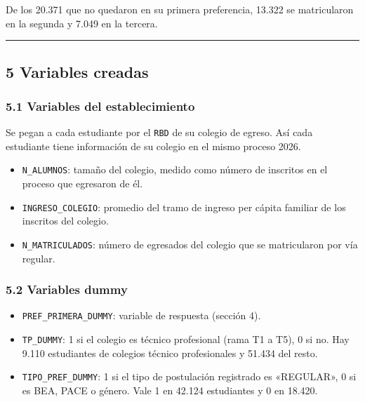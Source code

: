 \documentclass[11pt]{article}
\begin{document}
De los 20.371 que no quedaron en su primera preferencia, 13.322 se
matricularon en la segunda y 7.049 en la tercera.

\medskip\hrule\medskip

\subsection*{5 \; Variables creadas}

\subsubsection*{5.1 \; Variables del establecimiento}

Se pegan a cada estudiante por el \texttt{RBD} de su colegio de egreso.
Así cada estudiante tiene información de su colegio en el mismo proceso
2026.

\begin{itemize}[leftmargin=1.5em, itemsep=0.3em]
  \item \texttt{N\_ALUMNOS}: tamaño del colegio, medido como número de
        inscritos en el proceso que egresaron de él.
  \item \texttt{INGRESO\_COLEGIO}: promedio del tramo de ingreso per
        cápita familiar de los inscritos del colegio.
  \item \texttt{N\_MATRICULADOS}: número de egresados del colegio que se
        matricularon por vía regular.
\end{itemize}

\subsubsection*{5.2 \; Variables dummy}

\begin{itemize}[leftmargin=1.5em, itemsep=0.3em]
  \item \texttt{PREF\_PRIMERA\_DUMMY}: variable de respuesta (sección 4).
  \item \texttt{TP\_DUMMY}: 1 si el colegio es técnico profesional
        (rama T1 a T5), 0 si no. Hay 9.110 estudiantes de colegios
        técnico profesionales y 51.434 del resto.
  \item \texttt{TIPO\_PREF\_DUMMY}: 1 si el tipo de postulación
        registrado es «REGULAR», 0 si es BEA, PACE o género. Vale 1 en
        42.124 estudiantes y 0 en 18.420.
\end{itemize}
\end{document}
